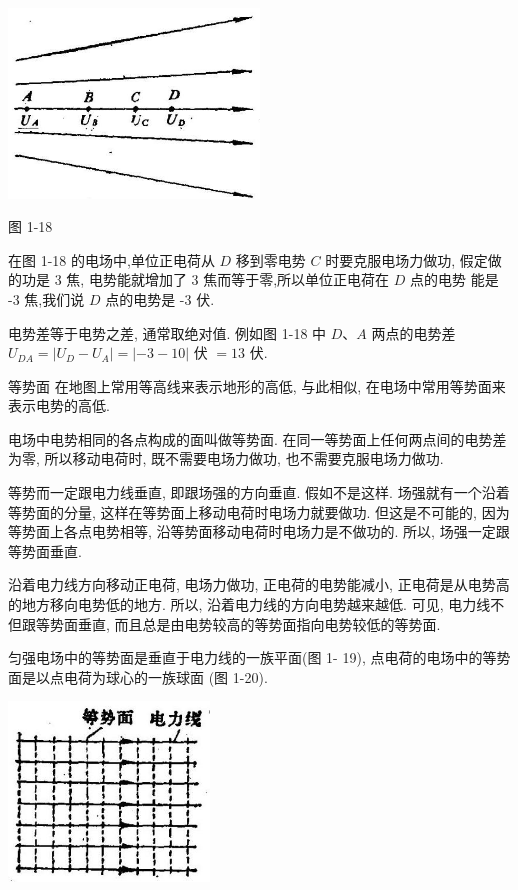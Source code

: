 \documentclass[10pt]{article}
\begin{document}
\begin{center}
\includegraphics[max width=0.5\textwidth]{images/01913056-1f15-74d8-9184-9aab52c9d66b_32_878389.jpg}
\end{center}

图 1-18

在图 1-18 的电场中,单位正电荷从 \(D\) 移到零电势 \(C\) 时要克服电场力做功, 假定做的功是 3 焦, 电势能就增加了 3 焦而等于零,所以单位正电荷在 \(D\) 点的电势 能是 -3 焦,我们说 \(D\) 点的电势是 -3 伏.

电势差等于电势之差, 通常取绝对值. 例如图 1-18 中 \(D\text{、}A\) 两点的电势差 \({U}_{DA} = \left| {{U}_{D} - {U}_{A}}\right| = \left| {-3 - {10}}\right|\) 伏 \(= {13}\) 伏.

等势面 在地图上常用等高线来表示地形的高低, 与此相似, 在电场中常用等势面来表示电势的高低.

电场中电势相同的各点构成的面叫做等势面. 在同一等势面上任何两点间的电势差为零, 所以移动电荷时, 既不需要电场力做功, 也不需要克服电场力做功.

等势而一定跟电力线垂直, 即跟场强的方向垂直. 假如不是这样. 场强就有一个沿着等势面的分量, 这样在等势面上移动电荷时电场力就要做功. 但这是不可能的, 因为等势面上各点电势相等, 沿等势面移动电荷时电场力是不做功的. 所以, 场强一定跟等势面垂直.

沿着电力线方向移动正电荷, 电场力做功, 正电荷的电势能减小, 正电荷是从电势高的地方移向电势低的地方. 所以, 沿着电力线的方向电势越来越低. 可见, 电力线不但跟等势面垂直, 而且总是由电势较高的等势面指向电势较低的等势面.

匀强电场中的等势面是垂直于电力线的一族平面(图 1- 19), 点电荷的电场中的等势面是以点电荷为球心的一族球面 (图 1-20).

\begin{center}
\includegraphics[max width=0.4\textwidth]{images/01913056-1f15-74d8-9184-9aab52c9d66b_33_753702.jpg}
\end{center}
\end{document}
